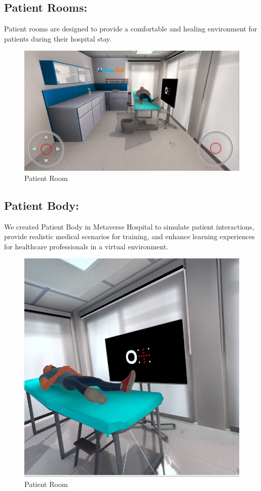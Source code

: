 \subsection{Patient Rooms:}	
Patient rooms are designed to provide a comfortable and healing environment for patients during their hospital stay.
	\begin{figure}[h]
		\centering
		\includegraphics[width=0.7\linewidth]{Images/Patient Room.png}
		\caption{Patient Room}
		\label{fig:Patient-Room}
	\end{figure}	

\subsection{Patient Body:}	
We created Patient Body in Metaverse Hospital to simulate patient interactions, provide realistic medical scenarios for training, and enhance learning experiences for healthcare professionals in a virtual environment.
\begin{figure}[h]
	\centering
	\includegraphics[width=0.7\linewidth]{Images/Patient Body.png}
	\caption{Patient Room}
	\label{fig:system-diagram}
\end{figure}	

	